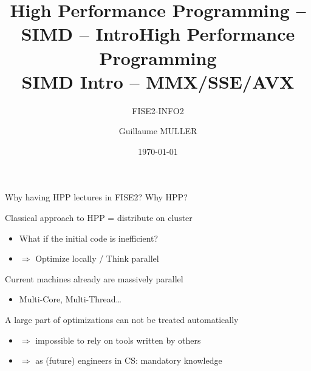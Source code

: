 \documentclass[presentation]{beamer}
\author{Guillaume MULLER}
\date{\today}
\title{High Performance Programming -- SIMD -- Intro}
\title[HPP -- SIMD -- Intro]{High Performance Programming\\SIMD Intro -- MMX/SSE/AVX}
\subtitle{FISE2-INFO2}
\begin{document}
\maketitle

\section*{}
\label{sec:org463391e}

\begin{frame}[label={sec:org2754b3a}]{Why having HPP lectures in FISE2? Why HPP?}
\pause
\begin{block}{Classical approach to HPP = distribute on cluster}
\begin{itemize}
\item What if the initial code is inefficient?
\item \(\Rightarrow\) Optimize locally / Think parallel
\end{itemize}
\pause
\end{block}
\begin{block}{Current machines already are massively parallel}
\begin{itemize}
\item Multi-Core, Multi-Thread\ldots{}
\end{itemize}
\pause
\end{block}
\begin{block}{A large part of optimizations can not be treated automatically}
\begin{itemize}
\item \(\Rightarrow\) impossible to rely on tools written by others
\item \(\Rightarrow\) as (future) engineers in CS: mandatory knowledge
\end{itemize}
\end{block}
\end{frame}
\end{document}
